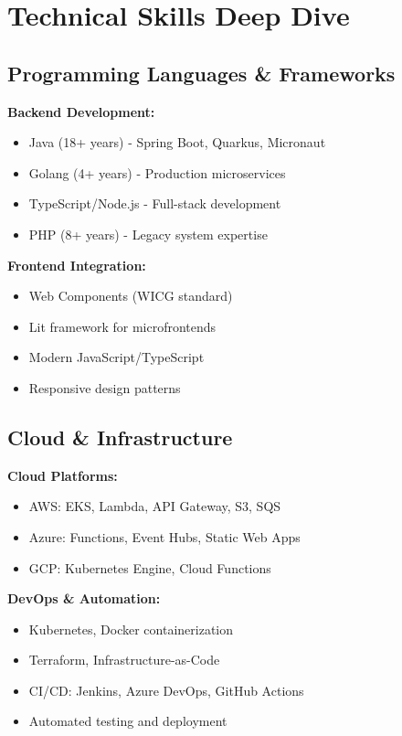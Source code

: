 \documentclass[11pt,a4paper]{article}
\begin{document}
\section{Technical Skills Deep Dive}

\subsection{Programming Languages \& Frameworks}
\begin{multicols}{2}
\textbf{Backend Development:}
\begin{itemize}
    \item Java (18+ years) - Spring Boot, Quarkus, Micronaut
    \item Golang (4+ years) - Production microservices
    \item TypeScript/Node.js - Full-stack development
    \item PHP (8+ years) - Legacy system expertise
\end{itemize}

\textbf{Frontend Integration:}
\begin{itemize}
    \item Web Components (WICG standard)
    \item Lit framework for microfrontends
    \item Modern JavaScript/TypeScript
    \item Responsive design patterns
\end{itemize}
\end{multicols}

\subsection{Cloud \& Infrastructure}
\begin{multicols}{2}
\textbf{Cloud Platforms:}
\begin{itemize}
    \item AWS: EKS, Lambda, API Gateway, S3, SQS
    \item Azure: Functions, Event Hubs, Static Web Apps
    \item GCP: Kubernetes Engine, Cloud Functions
\end{itemize}

\textbf{DevOps \& Automation:}
\begin{itemize}
    \item Kubernetes, Docker containerization
    \item Terraform, Infrastructure-as-Code
    \item CI/CD: Jenkins, Azure DevOps, GitHub Actions
    \item Automated testing and deployment
\end{itemize}
\end{multicols}
\end{document}
